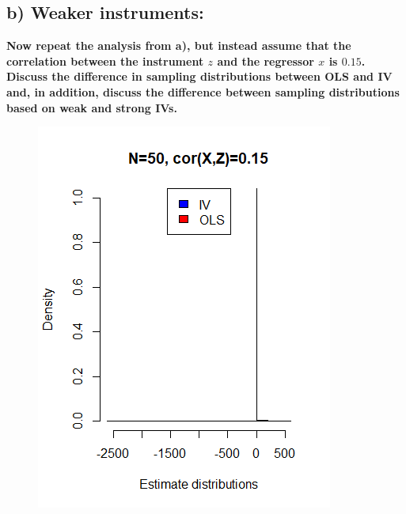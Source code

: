 \documentclass[a4paper,12pt,oneside,English]{article}
\begin{document}
\subsection{b) Weaker instruments:}
\textbf{Now repeat the analysis from a), but instead assume that the correlation between the instrument $z$ and the regressor $x$ is $0.15$. Discuss the difference in sampling distributions between OLS and IV and, in addition, discuss the difference between sampling distributions based on weak and strong IVs.}

\begin{figure}[p!]
    \begin{minipage}[b]{0.5\linewidth}
        \includegraphics[width=\linewidth]{Fig1A.png}
    \end{minipage}
    \begin{minipage}[b]{0.5\linewidth}

\end{minipage}
\end{figure}
\end{document}
